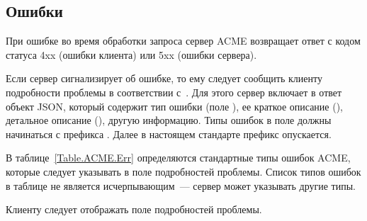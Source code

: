 \subsection{Ошибки}\label{ACME.Transport.Err}


При ошибке во время обработки запроса сервер ACME возвращает ответ с кодом 
статуса 4xx (ошибки клиента) или 5xx (ошибки сервера).

Если сервер сигнализирует об ошибке, то ему следует сообщить клиенту 
подробности проблемы в соответствии с~\cite{RFC7807}. Для этого сервер включает 
в ответ объект JSON, который содержит тип ошибки (поле ), ее краткое
описание (), детальное описание (), другую информацию.
%
Типы ошибок в поле  должны начинаться с префикса 
. Далее в настоящем стандарте префикс 
опускается.

В таблице~\ref{Table.ACME.Err} определяются стандартные типы ошибок ACME, 
которые следует указывать в поле  подробностей проблемы.
%
Список типов ошибок в таблице не является исчерпывающим~--- сервер может 
указывать другие типы. 


Клиенту следует отображать поле  подробностей проблемы.

